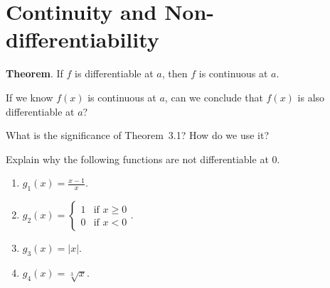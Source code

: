 \documentclass[../main.tex]{subfiles}
\begin{document}
 \section{Continuity and Non-differentiability}
  \begin{mdframed}[style=withref-compact] \label{thm:differentiability-implies-continuity}
    \textbf{Theorem}. If \(f\) is {differentiable} at \(a\), then \(f\) is {continuous} at \(a\).

  \end{mdframed}

  \faComment{} If we know \(f(x)\) is continuous at \(a\), can we conclude that \(f(x)\) is also differentiable at \(a\)?

  \faComment{} What is the significance of Theorem~3.1? How do we use it?

  \begin{example}
    Explain why the following functions are not differentiable at \(0\).

    \begin{enumerate}[wide]
      \item \(g_{1}(x) = \frac{x - 1}{x}\).

      \item \(g_{2}(x) = \begin{cases} 1 &\text{if } x \ge 0 \\ 0 &\text{if } x < 0 \end{cases}\).

      \item \(g_{3}(x) = |x|\).

      \item \(g_{4}(x) = \sqrt[3]{x}\). 

    \end{enumerate}
  \end{example}

  \clearpage
\end{document}
